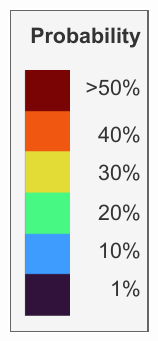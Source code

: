         \begin{figure}[H]
        \centering
        \begin{subfigure}[t]{0.06\textwidth}
        \centering
        \includegraphics[width=\linewidth,height=3.65\linewidth]{figs_06/legend_probability.pdf}

\end{subfigure}
\end{figure}
